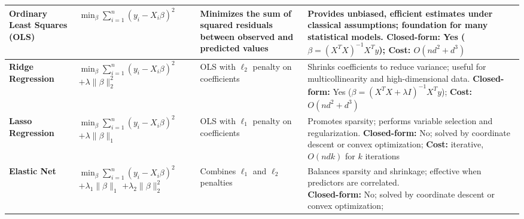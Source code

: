 \documentclass[10pt]{article}
\begin{document}
\begin{longtable}{|>{\bfseries}m{3cm}|m{5cm}|p{3.5cm}|p{6.5cm}|}
		Ordinary Least Squares (OLS) & \parbox{5cm}{
				$\min_{\beta} \sum_{i=1}^n (y_i - X_i\beta)^2$
		} & \parbox{3.5cm}{\vspace{2pt}Minimizes the sum of squared residuals between observed
		and predicted values} & \parbox{6.5cm}{\vspace{2pt}
				Provides unbiased, efficient estimates under classical assumptions; foundation for
				many statistical models. \\
				\textbf{Closed-form:} Yes ($\beta = (X^TX)^{-1}X^Ty$); \\
				\textbf{Cost:} $O(nd^2 + d^3)$
		} \\
		\hline
		Ridge Regression & \parbox{5cm}{
				$\min_{\beta} \sum_{i=1}^n (y_i - X_i\beta)^2$
				$+ \lambda \lVert\beta\rVert_2^2$
		} & \parbox{3.5cm}{\vspace{2pt}OLS with $\ell_2$ penalty on coefficients} &
		\parbox{6.5cm}{\vspace{2pt}
				Shrinks coefficients to reduce variance; useful for multicollinearity and
				high-dimensional data. \\
				\textbf{Closed-form:} Yes ($\beta = (X^TX + \lambda I)^{-1}X^Ty$); \\
				\textbf{Cost:} $O(nd^2 + d^3)$
		} \\
		\hline
		Lasso Regression & \parbox{5cm}{
				$\min_{\beta} \sum_{i=1}^n (y_i - X_i\beta)^2$
				$+ \lambda \lVert\beta\rVert_1$
		} & \parbox{3.5cm}{\vspace{2pt}OLS with $\ell_1$ penalty on coefficients} &
		\parbox{6.5cm}{\vspace{2pt}
				Promotes sparsity; performs variable selection and regularization. \\
				\textbf{Closed-form:} No; solved by coordinate descent or convex optimization; \\
				\textbf{Cost:} iterative, $O(ndk)$ for $k$ iterations
		} \\
		\hline
		Elastic Net & \parbox{5cm}{
				$\min_{\beta} \sum_{i=1}^n (y_i - X_i\beta)^2$ \\
				$+ \lambda_1 \lVert\beta\rVert_1$
				$+ \lambda_2 \lVert\beta\rVert_2^2$
		} & \parbox{3.5cm}{\vspace{2pt}Combines $\ell_1$ and $\ell_2$ penalties} &
		\parbox{6.5cm}{\vspace{2pt}
				Balances sparsity and shrinkage; effective when predictors are correlated. \\
				\textbf{Closed-form:} No; solved by coordinate descent or convex optimization; \\
}
\end{longtable}
\end{document}
